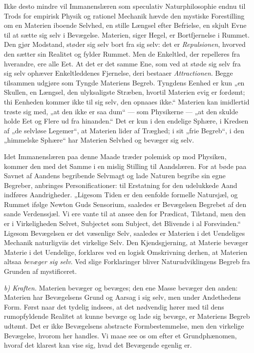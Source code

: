 \documentclass[12pt,a4paper]{book}
\newcommand{\runin}[1]{\emph{#1}\hspace{0.4em}}
\begin{document}
Ikke desto mindre vil Immanenslæren som speculativ Naturphilosophie
endnu til Trods for empirisk Physik og rationel Mechanik hævde den
mystiske Forestilling om en Materien iboende Selvhed, en stille Længsel
efter Befrielse, en skjult Evne til at sætte sig selv i Bevægelse.
Materien, siger Hegel, er Bortfjernelse i Rummet. Den gjør Modstand,
støder sig selv bort fra sig selv: det er \emph{Repulsionen}, hvorved
den sætter sin Realitet og fylder Rummet. Men de Enkeltled, der
repelleres fra hverandre, ere alle Eet. At det er det samme Ene, som
ved at støde sig selv fra sig selv ophæver Enkeltleddenes Fjernelse,
deri bestaaer \emph{Attractionen}. Begge tilsammen udgjøre som Tyngde
Materiens Begreb. Tyngdens Eenhed er kun „en Skullen, en Længsel, den
ulyksaligste Stræben, hvortil Materien evig er
fordømt; thi Eenheden kommer ikke til sig selv, den opnaaes ikke.“
Materien kan imidlertid trøste sig med, „at den ikke er saa dum“ ---
som Physikerne --- „at den skulde holde Eet og Flere ud fra
hinanden.“ Det er kun i den endelige Sphære, i Kredsen af „de selvløse
Legemer“, at Materien lider af Træghed; i sit „frie Begreb“, i den
„himmelske Sphære“ har Materien Selvhed og bevæger sig selv.

Idet Immanenslæren paa denne Maade træder polemisk op mod Physiken,
kommer den med det Samme i en mislig Stilling til Aandslæren. For at
bøde paa Savnet af Aandens begribende Selvmagt og lade Naturen begribe
sin egne Begreber, anbringes Personificationer: til Erstatning for den
udelukkede Aand indføres Aandrigheder. „Ligesom Tiden er den eenfolde
formelle Natursjæl, og Rummet ifølge Newton Guds Sensorium, saaledes er
Bevægelsen Begrebet af den sande Verdenssjæl. Vi ere vante til at
ansee den for Prædicat, Tilstand, men den er i Virkeligheden Selvet,
Subjectet som Subject, det Blivende i al Forsvinden.“ Ligesom
Bevægelsen er det væsenlige Selv, saaledes er Materien i det Uendeliges
Mechanik naturligviis det virkelige Selv. Den Kjendsgjerning, at
Materie bevæger Materie i det Uendelige, forklares ved en logisk
Omskrivning derhen, at Materien altsaa \emph{bevæger sig selv}. Ved
slige Forklaringer bliver Naturudviklingens Begreb fra Grunden af
mystificeret.

\runin{b) Kraften.} Materien bevæger og bevæges; den ene Masse bevæger
den anden: Materien har Bevægelsens Grund og Aarsag i sig selv, men
under Andethedens Form. Først naar det tydelig indsees, at det
nødvendig hører med til dens rumopfyldende Realitet at kunne bevæge og
lade sig bevæge, er Materiens Begreb udtømt. Det er ikke Bevægelsens
abstracte Formbestemmelse, men den virkelige Bevægelse, hvorom her
handles. Vi maae see os om efter et
Grundphænomen, hvoraf det klarest kan vise sig, hvad det Bevægende
egenlig er.
\end{document}

